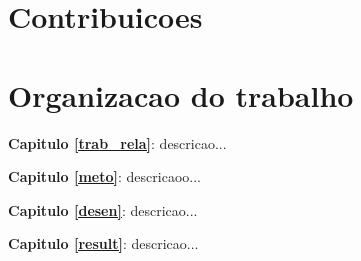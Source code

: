 
\section{Contribuicoes}




\section{Organizacao do trabalho}

\noindent \textbf{Capitulo \ref{trab_rela}}: descricao...

\noindent \textbf{Capitulo \ref{meto}}: descricaoo...

\noindent \textbf{Capitulo \ref{desen}}: descricao...

\noindent \textbf{Capitulo \ref{result}}: descricao...